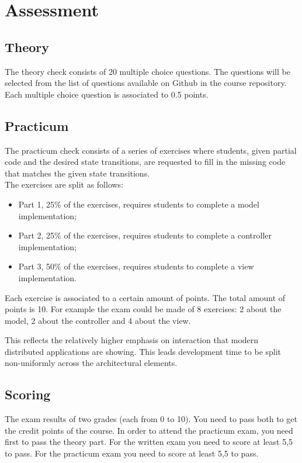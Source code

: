 \section{Assessment}

\subsection*{Theory}
The theory check consists of 20 multiple choice questions. The questions will be selected from the list of questions available on Github in the course repository. Each multiple choice question is associated to 0.5 points. 
 
\subsection*{Practicum}
The practicum check consists of a series of exercises where students, given partial code and the desired state transitions, are requested to fill in the
missing code that matches the given state transitions.
\\
The exercises are split as follows: 
\begin{itemize}
\item Part 1, 25\% of the exercises, requires students to complete a model implementation; 
\item Part 2, 25\% of the exercises, requires students to complete a controller implementation; 
\item Part 3, 50\% of the exercises, requires students to complete a view implementation.
\end{itemize}
Each exercise is associated to a certain amount of points. The total amount of points is 10.
For example the exam could be made of 8 exercises: 2 about the model, 2
about the controller and 4 about the view.

This reflects the relatively higher emphasis on interaction that modern
distributed applications are showing. This leads development time to be
split non-uniformly across the architectural elements.

\subsection*{Scoring}

The exam results of two grades (each from 0 to 10). You need to pass both to get the credit points of the course. In order to attend the practicum exam, you need first to pass the theory part.
For the written exam you need to score at least 5,5 to pass. 
For the practicum exam you need to score at least 5,5 to pass.  



